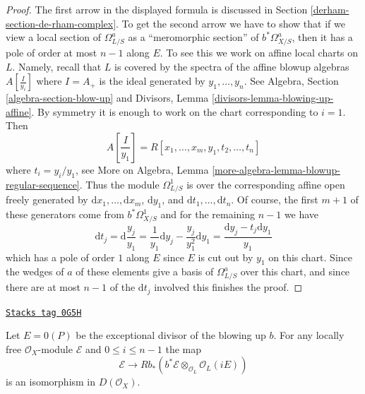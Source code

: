 \begin{proof}
The first arrow in the displayed formula is
discussed in Section \ref{derham-section-de-rham-complex}.
To get the second arrow we have to show that if we view
a local section of $\Omega^a_{L/S}$ as a ``meromorphic section''
of $b^*\Omega^a_{X/S}$, then it has a pole of order at most
$n - 1$ along $E$. To see this we work on affine local charts
on $L$. Namely, recall that $L$ is covered by the spectra of the
affine blowup algebras $A[\frac{I}{y_i}]$ where $I = A_{+}$
is the ideal generated by $y_1, \ldots, y_n$. See
Algebra, Section \ref{algebra-section-blow-up} and
Divisors, Lemma \ref{divisors-lemma-blowing-up-affine}.
By symmetry it is enough to work on the
chart corresponding to $i = 1$. Then
$$
A[\frac{I}{y_1}] = R[x_1, \ldots, x_m, y_1, t_2, \ldots, t_n]
$$
where $t_i = y_i/y_1$, see
More on Algebra, Lemma \ref{more-algebra-lemma-blowup-regular-sequence}.
Thus the module $\Omega^1_{L/S}$ is over the corresponding
affine open freely generated by
$\text{d}x_1, \ldots, \text{d}x_m$, $\text{d}y_1$, and
$\text{d}t_1, \ldots, \text{d}t_n$.
Of course, the first $m + 1$ of these generators come from
$b^*\Omega^1_{X/S}$ and for the remaining $n - 1$ we have
$$
\text{d}t_j =
\text{d}\frac{y_j}{y_1} =
\frac{1}{y_1}\text{d}y_j - \frac{y_j}{y_1^2}\text{d}y_1 =
\frac{\text{d}y_j - t_j \text{d}y_1}{y_1}
$$
which has a pole of order $1$ along $E$ since $E$ is cut out by $y_1$
on this chart. Since the wedges of $a$ of these elements give a basis
of $\Omega^a_{L/S}$ over this chart, and since there are at most
$n - 1$ of the $\text{d}t_j$ involved this finishes the proof.
\end{proof}

\begin{lemma}
\label{derham-lemma-blowup-twist-same-cohomology}
\href{https://stacks.math.columbia.edu/tag/0G5H}{\texttt{Stacks tag 0G5H}}

Let $E = 0(P)$ be the exceptional divisor of the blowing up $b$.
For any locally free $\mathcal{O}_X$-module $\mathcal{E}$ and
$0 \leq i \leq n - 1$ the map
$$
\mathcal{E}
\longrightarrow
Rb_*(b^*\mathcal{E} \otimes_{\mathcal{O}_L} \mathcal{O}_L(iE))
$$
is an isomorphism in $D(\mathcal{O}_X)$.
\end{lemma}

